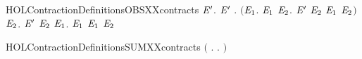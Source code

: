 \begin{SaveVerbatim}{HOLContractionDefinitionsOBSXXcontracts}
\HOLTokenTurnstile{} \HOLSymConst{\HOLTokenForall{}} \ensuremath{\HOLBoundVar{E}\sp{\prime{}}}.
       \ensuremath{\HOLBoundVar{E}\sp{\prime{}}} \HOLSymConst{\HOLTokenEquiv{}}
     \HOLSymConst{\HOLTokenForall{}}. \ensuremath{(}\HOLSymConst{\HOLTokenForall{}}\ensuremath{\HOLBoundVar{E}\sb{\mathrm{1}}}.  \HOLTokenTransBegin{}\HOLTokenTransEnd \ensuremath{\HOLBoundVar{E}\sb{\mathrm{1}}} \HOLSymConst{\HOLTokenImp{}} \HOLSymConst{\HOLTokenExists{}}\ensuremath{\HOLBoundVar{E}\sb{\mathrm{2}}}. \ensuremath{\HOLBoundVar{E}\sp{\prime{}}} \HOLTokenTransBegin{}\HOLTokenTransEnd \ensuremath{\HOLBoundVar{E}\sb{\mathrm{2}}} \HOLSymConst{\HOLTokenConj{}} \ensuremath{\HOLBoundVar{E}\sb{\mathrm{1}}}  \ensuremath{\HOLBoundVar{E}\sb{\mathrm{2}}}\ensuremath{)} \HOLSymConst{\HOLTokenConj{}}
         \HOLSymConst{\HOLTokenForall{}}\ensuremath{\HOLBoundVar{E}\sb{\mathrm{2}}}. \ensuremath{\HOLBoundVar{E}\sp{\prime{}}} \HOLTokenTransBegin{}\HOLTokenTransEnd \ensuremath{\HOLBoundVar{E}\sb{\mathrm{2}}} \HOLSymConst{\HOLTokenImp{}} \HOLSymConst{\HOLTokenExists{}}\ensuremath{\HOLBoundVar{E}\sb{\mathrm{1}}}.  \HOLTokenWeakTransBegin{}\HOLTokenWeakTransEnd \ensuremath{\HOLBoundVar{E}\sb{\mathrm{1}}} \HOLSymConst{\HOLTokenConj{}}  \ensuremath{\HOLBoundVar{E}\sb{\mathrm{1}}} \ensuremath{\HOLBoundVar{E}\sb{\mathrm{2}}}
\end{SaveVerbatim}
\newcommand{\HOLContractionDefinitionsOBSXXcontracts}{\UseVerbatim{HOLContractionDefinitionsOBSXXcontracts}}
\begin{SaveVerbatim}{HOLContractionDefinitionsSUMXXcontracts}
\HOLTokenTurnstile{}  \HOLSymConst{\ensuremath{=}} \ensuremath{(}\HOLTokenLambda{} . \HOLSymConst{\HOLTokenForall{}}.  \HOLSymConst{\ensuremath{+}}    \HOLSymConst{\ensuremath{+}} \ensuremath{)}
\end{SaveVerbatim}
\newcommand{\HOLContractionDefinitionsSUMXXcontracts}{\UseVerbatim{HOLContractionDefinitionsSUMXXcontracts}}
\newcommand{\HOLContractionDefinitions}{
\HOLDfnTag{Contraction}{C_contracts}\HOLContractionDefinitionsCXXcontracts
\HOLDfnTag{Contraction}{CONTRACTION}\HOLContractionDefinitionsCONTRACTION
\HOLDfnTag{Contraction}{contracts_def}\HOLContractionDefinitionscontractsXXdef
\HOLDfnTag{Contraction}{OBS_contracts}\HOLContractionDefinitionsOBSXXcontracts
\HOLDfnTag{Contraction}{SUM_contracts}\HOLContractionDefinitionsSUMXXcontracts
}
